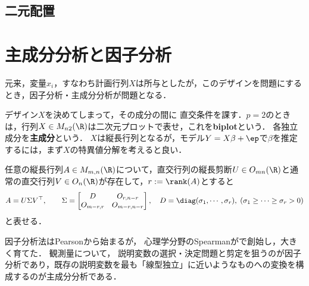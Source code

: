 \documentclass[uplatex,dvipdfmx]{jsreport}
\begin{document}
\subsection{二元配置}

\section{主成分分析と因子分析}

\begin{tcolorbox}[colframe=ForestGreen, colback=ForestGreen!10!white,breakable,colbacktitle=ForestGreen!40!white,coltitle=black,fonttitle=\bfseries\sffamily,
title=]
    元来，変量$x_i$，すなわち計画行列$X$は所与としたが，このデザインを問題にするとき，因子分析・主成分分析が問題となる．
\end{tcolorbox}

\begin{remarks}[主成分分析]
    デザイン$X$を決めてしまって，その成分の間に
    直交条件を課す．$p=2$のときは，行列$X\in M_{n2}(\R)$は二次元プロットで表せ，これを\textbf{biplot}という．
    各独立成分を\textbf{主成分}という．
    $X$は縦長行列となるが，モデル$Y=X\beta+\ep$で$\beta$を推定するには，まず$X$の特異値分解を考えると良い．
\end{remarks}

\begin{proposition}
    任意の縦長行列$A\in M_{m,n}(\R)$について，直交行列の縦長剪断$U\in O_{mn}(\R)$と通常の直交行列$V\in O_n(\R)$が存在して，$r:=\rank(A)$とすると
    \[A=U\Sigma V^\top,\qquad\Sigma=\begin{bmatrix}D&O_{r,n-r}\\O_{m-r,r}&O_{m-r,n-r}\end{bmatrix},\quad D=\diag(\sigma_1,\cdots,\sigma_r),\;(\sigma_1\ge\cdots\ge\sigma_r>0)\]
    と表せる．
\end{proposition}

\begin{history}[因子分析]
    因子分析法はPearsonから始まるが，
    心理学分野のSpearmanが\cite{Spearman04}で創始し，大きく育てた．
    観測量について，
    説明変数の選択・決定問題と剪定を狙うのが因子分析であり，既存の説明変数を最も「線型独立」に近いようなものへの変換を構成するのが主成分分析である．
\end{history}
\end{document}
